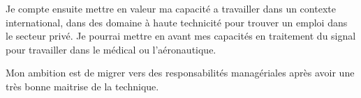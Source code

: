 Je compte ensuite mettre en valeur ma capacité a travailler dans un contexte international,
dans des domaine à haute technicité pour trouver un emploi  dans le secteur privé.
Je pourrai mettre en avant mes capacités en traitement du signal pour travailler dans le médical ou l'aéronautique.

Mon ambition est de migrer vers des responsabilités managériales après avoir une très bonne maitrise de la technique.




\appendix








